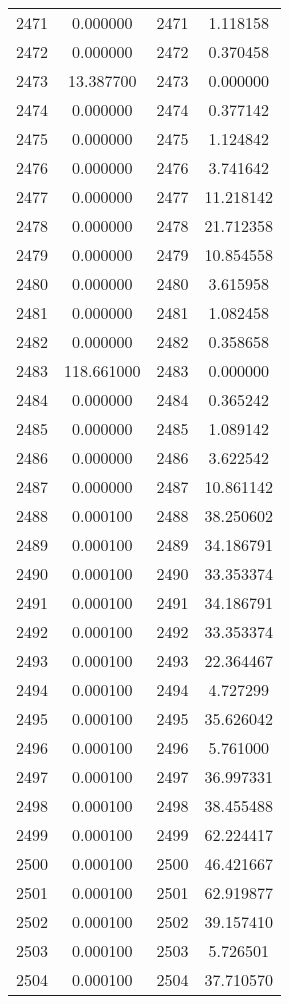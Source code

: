 \documentclass[12pt]{article}
\begin{document}
\begin{longtable}{@{}cccc@{}}
2471 & 0.000000 & 2471 & 1.118158 \\
2472 & 0.000000 & 2472 & 0.370458 \\
2473 & 13.387700 & 2473 & 0.000000 \\
2474 & 0.000000 & 2474 & 0.377142 \\
2475 & 0.000000 & 2475 & 1.124842 \\
2476 & 0.000000 & 2476 & 3.741642 \\
2477 & 0.000000 & 2477 & 11.218142 \\
2478 & 0.000000 & 2478 & 21.712358 \\
2479 & 0.000000 & 2479 & 10.854558 \\
2480 & 0.000000 & 2480 & 3.615958 \\
2481 & 0.000000 & 2481 & 1.082458 \\
2482 & 0.000000 & 2482 & 0.358658 \\
2483 & 118.661000 & 2483 & 0.000000 \\
2484 & 0.000000 & 2484 & 0.365242 \\
2485 & 0.000000 & 2485 & 1.089142 \\
2486 & 0.000000 & 2486 & 3.622542 \\
2487 & 0.000000 & 2487 & 10.861142 \\
2488 & 0.000100 & 2488 & 38.250602 \\
2489 & 0.000100 & 2489 & 34.186791 \\
2490 & 0.000100 & 2490 & 33.353374 \\
2491 & 0.000100 & 2491 & 34.186791 \\
2492 & 0.000100 & 2492 & 33.353374 \\
2493 & 0.000100 & 2493 & 22.364467 \\
2494 & 0.000100 & 2494 & 4.727299 \\
2495 & 0.000100 & 2495 & 35.626042 \\
2496 & 0.000100 & 2496 & 5.761000 \\
2497 & 0.000100 & 2497 & 36.997331 \\
2498 & 0.000100 & 2498 & 38.455488 \\
2499 & 0.000100 & 2499 & 62.224417 \\
2500 & 0.000100 & 2500 & 46.421667 \\
2501 & 0.000100 & 2501 & 62.919877 \\
2502 & 0.000100 & 2502 & 39.157410 \\
2503 & 0.000100 & 2503 & 5.726501 \\
2504 & 0.000100 & 2504 & 37.710570 \\

\end{longtable}
\end{document}
